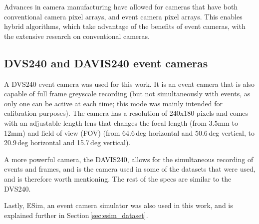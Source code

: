 Advances in camera manufacturing have allowed for cameras that have both conventional camera pixel arrays, and event camera pixel arrays. This enables hybrid algorithms, which take advantage of the benefits of event cameras, with the extensive research on conventional cameras.  

\subsection{DVS240 and DAVIS240 event cameras}

A DVS240 event camera was used for this work. It is an event camera that is also capable of full frame greyscale recording (but not simultaneously with events, as only one can be active at each time; this mode was mainly intended for calibration purposes). The camera has a resolution of 240x180 pixels and comes with an adjustable length lens that changes the focal length (from 3.5mm to 12mm) and field of view (FOV) (from 64.6\,deg horizontal and 50.6\,deg vertical, to 20.9\,deg horizontal and 15.7\,deg vertical).

A more powerful camera, the DAVIS240, allows for the simultaneous recording of events and frames, and is the camera used in some of the datasets that were used, and is therefore worth mentioning. The rest of the specs are similar to the DVS240.

Lastly, ESim, an event camera simulator was also used in this work, and is explained further in Section\,\ref{sec:esim_dataset}.